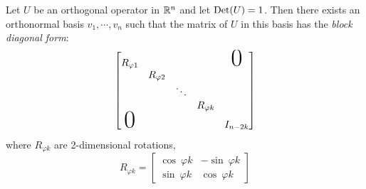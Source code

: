 \begin{theorem}
Let $U$ be an orthogonal operator in $\mathbb{R}^{n}$ and let $\operatorname{Det}(U) = 1$. Then there exists an orthonormal basis $v_{1}, \cdots, v_{n}$ such that the matrix of $U$ in this basis has the \textit{block diagonal form}:
$$\begin{bmatrix}
R_{\varphi 1} & & & & \makebox{\Huge 0} \\
 & R_{\varphi 2} & & & \\ 
 & & \ddots & & \\
 & & & R_{\varphi k} & \\
 \makebox{\Huge 0} & & & & I_{n - 2k}
\end{bmatrix}$$
where $R_{\varphi k}$ are 2-dimensional rotations, 
$$R_{\varphi k} = \begin{bmatrix}
\cos \ \varphi k & -\sin \  \varphi k \\
\sin \ \varphi k & \cos \ \varphi k
\end{bmatrix}$$
\end{theorem}

